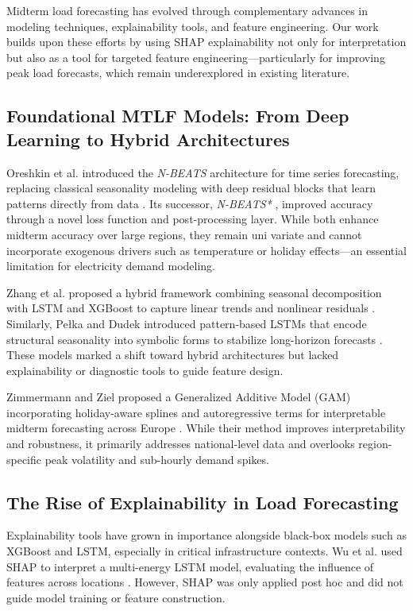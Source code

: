 \documentclass{ifacconf}
\begin{document}
Midterm load forecasting has evolved through complementary advances in modeling techniques, explainability tools, and feature engineering. Our work builds upon these efforts by using SHAP explainability not only for interpretation but also as a tool for targeted feature engineering—particularly for improving peak load forecasts, which remain underexplored in existing literature.

\subsection{Foundational MTLF Models: From Deep Learning to Hybrid Architectures}

Oreshkin et al. introduced the \textit{N-BEATS} architecture for time series forecasting, replacing classical seasonality modeling with deep residual blocks that learn patterns directly from data \cite{Oreshkin2020NBEATSNN}. Its successor, \textit{N-BEATS*} \cite{Kasprzyk2024EnhancedNF}, improved accuracy through a novel loss function and post-processing layer. While both enhance midterm accuracy over large regions, they remain uni variate and cannot incorporate exogenous drivers such as temperature or holiday effects—an essential limitation for electricity demand modeling.

Zhang et al. proposed a hybrid framework combining seasonal decomposition with LSTM and XGBoost to capture linear trends and nonlinear residuals \cite{Kasprzyk2024EnhancedNF}. Similarly, Pełka and Dudek introduced pattern-based LSTMs that encode structural seasonality into symbolic forms to stabilize long-horizon forecasts \cite{Peka2020PatternbasedLS}. These models marked a shift toward hybrid architectures but lacked explainability or diagnostic tools to guide feature design.

Zimmermann and Ziel proposed a Generalized Additive Model (GAM) incorporating holiday-aware splines and autoregressive terms for interpretable midterm forecasting across Europe \cite{Zimmermann2024EfficientMF}. While their method improves interpretability and robustness, it primarily addresses national-level data and overlooks region-specific peak volatility and sub-hourly demand spikes.

\subsection{The Rise of Explainability in Load Forecasting}

Explainability tools have grown in importance alongside black-box models such as XGBoost and LSTM, especially in critical infrastructure contexts. Wu et al. used SHAP to interpret a multi-energy LSTM model, evaluating the influence of features across locations \cite{Wu2022AnEF}. However, SHAP was only applied post hoc and did not guide model training or feature construction.
\end{document}
